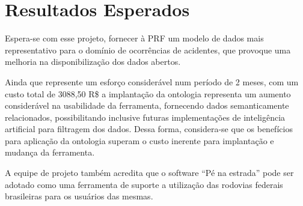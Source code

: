 \section{Resultados Esperados}

Espera-se com esse projeto, fornecer à PRF um modelo de dados mais representativo
para o domínio de ocorrências de acidentes, que provoque uma melhoria na
disponibilização dos dados abertos.

Ainda que represente um esforço considerável num período de 2 meses, com um custo total de 3088,50 R\$ a implantação da ontologia representa um aumento considerável na usabilidade da ferramenta, fornecendo dados semanticamente relacionados, possibilitando inclusive futuras implementações de inteligência artificial para filtragem dos dados. Dessa forma, considera-se que os benefícios para aplicação da ontologia superam o custo inerente para implantação e mudança da ferramenta. 

A equipe de projeto também acredita que o software “Pé na estrada” pode ser adotado como uma ferramenta de suporte a utilização das rodovias federais brasileiras para os usuários das mesmas.